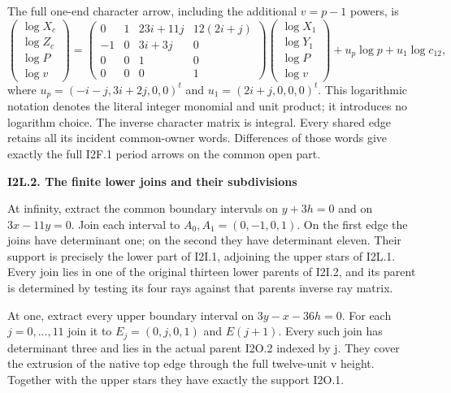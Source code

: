 The full one-end character arrow, including the
additional \(v=p-1\) powers, is
\[
 \begin{pmatrix}\log X_c\\\log Z_c\\\log P\\\log v\end{pmatrix}
 =
 \begin{pmatrix}
 0&1&23i+11j&12(2i+j)\\
 -1&0&3i+3j&0\\
 0&0&1&0\\0&0&0&1
 \end{pmatrix}
 \begin{pmatrix}\log X_1\\\log Y_1\\\log P\\\log v\end{pmatrix}
 +u_p\log p+u_1\log c_{12},
 \tag{I2L.3}
\]
where
\(u_p=(-i-j,3i+2j,0,0)^t\) and
\(u_1=(2i+j,0,0,0)^t\).
This logarithmic notation denotes the literal
integer monomial and unit product; it introduces
no logarithm choice. The inverse character
matrix is integral. Every shared edge retains
all its incident common-owner words. Differences
of those words give exactly the full I2F.1
period arrows on the common open part.

\par

\medskip\noindent\textbf{I2L.2. The finite lower joins and their subdivisions}

\par\nobreak

At infinity, extract the common boundary intervals
on \(y+3h=0\) and on \(3x-11y=0\). Join each interval to
\(A_{0},A_{1}=(0,-1,0,1)\). On the first edge the joins
have determinant one; on the second they have
determinant eleven. Their support is precisely the
lower part of I2I.1, adjoining the upper stars
of I2L.1. Every join lies in one of the original
thirteen lower parents of I2I.2, and its parent is
determined by testing its four rays against
that parent\textquotesingle s inverse ray matrix.

At one, extract every upper boundary interval on
\(3y-x-36h=0\). For each \(j=0,...,11\) join it to
\(E_j=(0,j,0,1)\) and \(E(j+1)\). Every such join has
determinant three and lies in the actual parent
I2O.2 indexed by j. They cover the extrusion of
the native top edge through the full twelve-unit
v height. Together with the upper stars they
have exactly the support I2O.1.

